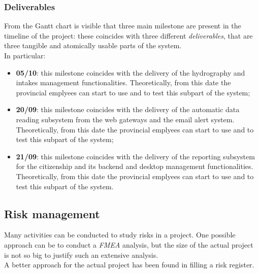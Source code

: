 \subsubsection{Deliverables}
From the Gantt chart is visible that three main milestone are present in the timeline of the project: these coincides with three different \textit{deliverables}, that are three tangible and atomically usable parts of the system.\\
In particular:
\begin{itemize}
    \item \textbf{05/10}: this milestone coincides with the delivery of the hydrography and intakes management functionalities. Theoretically, from this date the provincial emplyees can start to use and to test this subpart of the system;
    \item \textbf{20/09}: this milestone coincides with the delivery of the automatic data reading subsystem from the web gateways and the email alert system. Theoretically, from this date the provincial emplyees can start to use and to test this subpart of the system;
    \item \textbf{21/09}: this milestone coincides with the delivery of the reporting subsystem for the citizenship and its backend and desktop management functionalities. Theoretically, from this date the provincial emplyees can start to use and to test this subpart of the system.
\end{itemize}

\pagebreak
\subsection{Risk management}
Many activities can be conducted to study risks in a project. One possible approach can be to conduct a \textit{FMEA} analysis, but the size of the actual project is not so big to justify such an extensive analysis. \\
A better approach for the actual project has been found in filling a risk register.

